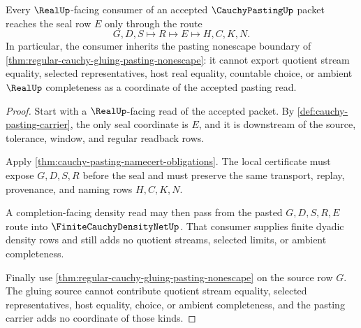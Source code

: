 \begin{theorem}
\label{thm:cauchy-pasting-real-seal-nonescape}
Every $\RealUp$-facing consumer of an accepted $\CauchyPastingUp$ packet reaches the seal row $E$ only through the route
$$
G,D,S \longmapsto R \longmapsto E \longmapsto H,C,K,N .
$$
In particular, the consumer inherits the pasting nonescape boundary of \autoref{thm:regular-cauchy-gluing-pasting-nonescape}: it cannot export quotient stream equality, selected representatives, host real equality, countable choice, or ambient $\RealUp$ completeness as a coordinate of the accepted pasting read.
\end{theorem}
\begin{proof}
Start with a $\RealUp$-facing read of the accepted packet. By \autoref{def:cauchy-pasting-carrier}, the only seal coordinate is $E$, and it is downstream of the source, tolerance, window, and regular readback rows.

Apply \autoref{thm:cauchy-pasting-namecert-obligations}. The local certificate must expose $G,D,S,R$ before the seal and must preserve the same transport, replay, provenance, and naming rows $H,C,K,N$.

A completion-facing density read may then pass from the pasted $G,D,S,R,E$ route into $\FiniteCauchyDensityNetUp$. That consumer supplies finite dyadic density rows and still adds no quotient streams, selected limits, or ambient completeness.

Finally use \autoref{thm:regular-cauchy-gluing-pasting-nonescape} on the source row $G$. The gluing source cannot contribute quotient stream equality, selected representatives, host equality, choice, or ambient completeness, and the pasting carrier adds no coordinate of those kinds.
\end{proof}

